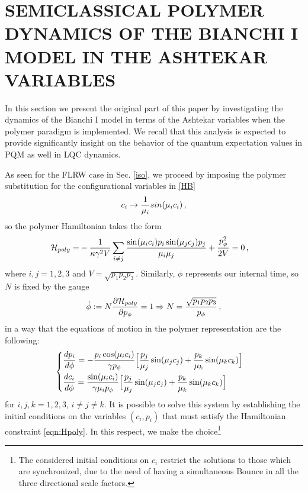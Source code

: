 \documentclass[aps,prd,twocolumn,nofootinbib,superscriptaddress]{revtex4-2}
\begin{document}
\section{SEMICLASSICAL POLYMER DYNAMICS OF THE BIANCHI I MODEL IN THE ASHTEKAR VARIABLES\label{sem1}}

In this section we present the original part of this paper by investigating the dynamics of the Bianchi I model in terms of the Ashtekar variables when the polymer paradigm is implemented. We recall that this analysis is expected to provide significantly insight on the behavior of the quantum expectation values in PQM as well in LQC dynamics.

As seen for the FLRW case in Sec. \ref{iso}, we proceed by imposing the polymer substitution for the configurational variables in \eqref{HB}		
\begin{equation}
   c_i\to{1\over\mu_i}sin({\mu_ic_i})\,,
\end{equation}
so the polymer Hamiltonian takes the form
\begin{align}
	\label{eqn:Hpoly}
	\mathcal{H}_{poly}=&-{1\over{\kappa\gamma^2V}}\sum_{i\neq j}{{\sin(\mu_ic_i)p_i\sin(\mu_jc_j)p_j}\over\mu_i\mu_j}+{p^2_{\phi}\over 2V}=0\,,
\end{align}
where $i,j=1,2,3$ and $V=\sqrt{p_1p_2p_3}$. Similarly, $\phi$ represents our internal time, so $N$ is fixed by the gauge
\begin{equation}
	\label{shiftf}
	\dot \phi:=N{{\partial \mathcal{H}_{poly}}\over{\partial p_\phi}}=1\Rightarrow N={{\sqrt{p_1p_2p_3}}\over p_\phi}\,,
\end{equation}
in a way that the equations of motion in the polymer representation are the following:
\begin{equation}
\label{Bsystem}
\begin{cases}
	\begin{aligned}
	\small &{{dp_i}\over{d\phi}}=-{{p_i\cos(\mu_ic_i)}\over\gamma p_{\phi}}\Big[{p_j\over{\mu_j}}\sin(\mu_jc_j)+{p_k\over{\mu_k}}\sin(\mu_kc_k)\Big]\\
	\small &{{dc_i}\over{d\phi}}={\sin(\mu_ic_i)\over{\gamma\mu_i p_{\phi}}}\Big[{p_j\over{\mu_j}}\sin(\mu_jc_j)+{p_k\over{\mu_k}}\sin(\mu_kc_k)\Big]
    \end{aligned}
\end{cases}
\end{equation}
for $i,j,k=1,2,3$, $i\neq j\neq k$. It is possible to solve this system by establishing the initial conditions on the variables $(c_{i},p_{i})$ that must satisfy the Hamiltonian constraint \eqref{eqn:Hpoly}. In this respect, we make the choice\footnote{The considered initial conditions on $c_i$ restrict the solutions to those which are synchronized, due to the need of having a simultaneous Bounce in all the three directional scale factors.}
\end{document}
